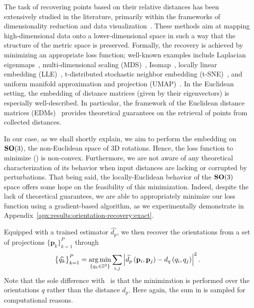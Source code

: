 The task of recovering points based on their relative distances has been extensively studied in the literature, primarily within the frameworks of dimensionality reduction and data visualization~\cite{belkin2003laplacian,kruskal1978multidimensional, maaten2008visualizing, mcinnes2018umap,dokmanic2015euclidean}.
These methods aim at mapping high-dimensional data onto a lower-dimensional space in such a way that the structure of the metric space is preserved.
Formally, the recovery is achieved by minimizing an appropriate loss function; well-known examples include Laplacian eigenmaps~\cite{10.1162/089976603321780317}, multi-dimensional scaling (MDS)~\cite{TaoShen2009}, Isomap~\cite{10.5555/3041838.3041947}, locally linear embedding (LLE)~\cite{Saul00anintroduction}, t-distributed stochastic neighbor embedding (t-SNE)~\cite{7b54165e73a3424b8820136bcf61ca89}, and uniform manifold approximation and projection (UMAP)~\cite{umap}.
In the Euclidean setting, the embedding of distance matrices (given by their eigenvectors) is especially well-described.
In particular, the framework of the Euclidean distance matrices (EDMs)~\cite{dokmanic2015euclidean} provides theoretical guarantees on the retrieval of points from collected distances.

In our case, as we shall shortly explain, we aim to perform the embedding on $\mathrm{\mathbf{SO}}(3)$, the non-Euclidean space of 3D rotations. Hence, the loss function to minimize () is non-convex. Furthermore, we are not aware of any theoretical characterization of its behavior when input distances are lacking or corrupted by perturbations. That being said, the locally-Euclidean behavior of the $\mathrm{\mathbf{SO}}(3)$ space offers some hope on the feasibility of this minimization.
Indeed, despite the lack of theoretical guarantees, we are able to appropriately minimize our loss function using a gradient-based algorithm, as we experimentally demonstrate in Appendix~\ref{apx:results:orientation-recovery:exact}.

Equipped with a trained estimator $\widehat{d_p}$, we then recover the orientations from a set of projections $\big\{ \mathbf{p}_k \big\}_{k=1}^P$ through
\begin{equation}
    \big\{ \widehat{q_k} \big\}_{k=1}^P = \operatorname*{arg\,min}_{\{q_k \in \mathbb{S}^3\}} \sum_{i,j} \left| \widehat{d_p} \left( \mathbf{p}_i, \mathbf{p}_j \right) - d_q\left(q_i,q_j\right) \right|^2.
    \label{eqn:orientation-recovery}
\end{equation}
Note that the sole difference with~ is that the minimization is performed over the orientations $q$ rather than the distance $d_p$.
Here again, the sum in  is sampled for computational reasons.

